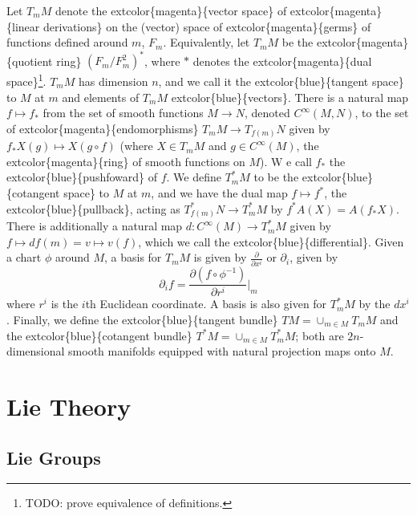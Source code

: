 \documentclass[
]{book}
\begin{document}
Let \(T_m M\) denote the extcolor\{magenta\}\{vector space\} of extcolor\{magenta\}\{linear derivations\} on the (vector) space of extcolor\{magenta\}\{germs\} of functions defined around \(m\), \(F_m\).
Equivalently, let \(T_m M\) be the extcolor\{magenta\}\{quotient ring\} \((F_m/F_m^2)^*\), where \(*\) denotes the extcolor\{magenta\}\{dual space\}\footnote{TODO: prove equivalence of definitions.}.
\(T_m M\) has dimension \(n\), and we call it the extcolor\{blue\}\{tangent space\} to \(M\) at \(m\) and elements of \(T_m M\) extcolor\{blue\}\{vectors\}.
There is a natural map \(f \mapsto f_*\) from the set of smooth functions \(M \to N\), denoted \(C^\infty(M,N)\), to the set of extcolor\{magenta\}\{endomorphisms\} \(T_m M \to T_{f(m)} N\) given by \(f_* X(g) \mapsto X(g \circ f)\) (where \(X \in T_m M\) and \(g \in C^\infty(M)\), the extcolor\{magenta\}\{ring\} of smooth functions on \(M\)). W
e call \(f_*\) the extcolor\{blue\}\{pushfoward\} of \(f\).
We define \(T_m^* M\) to be the extcolor\{blue\}\{cotangent space\} to \(M\) at \(m\), and we have the dual map \(f \mapsto f^*\), the extcolor\{blue\}\{pullback\}, acting as \(T_{f(m)}^* N \to T_m^* M\) by \(f^* A(X) = A(f_* X)\).
There is additionally a natural map \(d : C^\infty(M) \to T_m^* M\) given by \(f \mapsto df(m) = v \mapsto v(f)\), which we call the extcolor\{blue\}\{differential\}.
Given a chart \(\phi\) around \(M\), a basis for \(T_m M\) is given by \(\frac{\partial}{\partial x^i}\) or \(\partial_{i}\), given by
\begin{equation}     
    \partial_{i}f = \frac{\partial (f \circ \phi^{-1})}{\partial r^i}\Big|_m 
\end{equation}
where \(r^i\) is the \(i\)th Euclidean coordinate.
A basis is also given for \(T^*_m M\) by the \(dx^i\).
Finally, we define the extcolor\{blue\}\{tangent bundle\} \(TM = \cup_{m\in M} T_m M\) and the extcolor\{blue\}\{cotangent bundle\} \(T^*M = \cup_{m\in M} T_m^* M\); both are \(2n\)-dimensional smooth manifolds equipped with natural projection maps onto \(M\).

\hypertarget{lie-theory}{%
\chapter{Lie Theory}\label{lie-theory}}

\hypertarget{lie-groups}{%
\section{Lie Groups}\label{lie-groups}}
\end{document}
